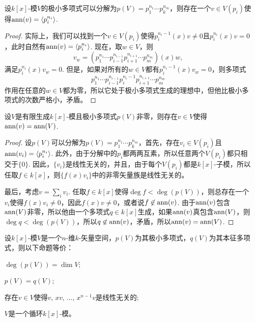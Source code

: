 \begin{lem}\label{lem:6.3.9}
    设$k[x]$-模$V$的极小多项式可以分解为$p(V)=p_1^{n_1}\cdots p_k^{n_m}$，则存在一个$v\in V(p_i)$使得$\operatorname{ann}(v)=\langle p_i^{n_i}\rangle$.
\end{lem}

\begin{proof}
    实际上，我们可以找到一个$v\in V(p_i)$使得$p_i^{n_i-1}(x)v\neq 0$且$p_i^{n_i}(x)v=0$，此时自然有$\operatorname{ann}(v)=\langle p_i^{n_i}\rangle$. 现在，取$w\in V$，则
    \[
        v_w=\left(p_1^{n_1}\cdots p_{i-1}^{n_{i-1}}p_{i+1}^{n_{i+1}}\cdots p_{m}^{n_{m}}\right)(x)w,
    \]
    满足$p_i^{n_i}(x)v_w=0$. 但是，如果对所有的$w\in V$都有$p_i^{n_i-1}(x)v_w=0$，则多项式
    \[
        p_1^{n_1}\cdots p_{i-1}^{n_{i-1}}p_i^{n_i-1}p_{i+1}^{n_{i+1}}\cdots p_{m}^{n_{m}}
    \]
    作用在任意的$w\in V$都为零，所以它处于极小多项式生成的理想中，但他比极小多项式的次数严格小，矛盾。
\end{proof}

\begin{pro}\label{pro:6.3.6}
    设$V$是有限生成$k[x]$-模且极小多项式$p(V)$非零，则存在$v\in V$使得$\operatorname{ann}(v)=\operatorname{ann}(V)$.
\end{pro}

\begin{proof}
    设$p(V)$可以分解为$p(V)=p_1^{n_1}\cdots p_k^{n_m}$，首先，存在$v_i\in V(p_i)$且$\operatorname{ann}(v_i)=\langle p_i^{n_i}\rangle$. 此外，由于分解中的$p_i$都两两互素，所以任意两个$V(p_i)$都只相交于$\{0\}$. 因此，$\{v_i\}$是线性无关的，并且，由于每个$V(p_i)$都是$k[x]$-子模，所以任取$f\in k[x]$，则$\{f(x)v_i\}$中的非零矢量族是线性无关的。

    最后，考虑$v=\sum_i v_i$. 任取$f\in k[x]$使得$\deg f<\deg (p(V))$，则总存在一个$v_i$使得$f(x)v_i\neq 0$，因此$f(x)v\neq 0$，或者说$f\not\in \operatorname{ann}(v)$. 由于$\operatorname{ann}(v)$包含$\operatorname{ann}(V)$非零，所以他由一个多项式$q\in k[x]$生成，如果$\operatorname{ann}(v)$真包含$\operatorname{ann}(V)$，则$\deg q< \deg (p(V))$，所以$q\not\in \operatorname{ann}(v)$，矛盾，所以$\operatorname{ann}(v)=\operatorname{ann}(V)$.
\end{proof}

\begin{pro}\label{pro:6.3.7}
    设$k[x]$-模$V$是一个$n$-维$k$-矢量空间，$p(V)$为其极小多项式，$q(V)$为其本征多项式，则以下命题等价：
    \begin{compactenum}
        \item $\deg(p(V))=\dim V$;
        \item $p(V)=q(V)$;
        \item 存在$v\in V$使得$v$, $xv$, $\dots$, $x^{n-1}v$是线性无关的;
        \item $V$是一个循环$k[x]$-模。
    \end{compactenum}
\end{pro}

